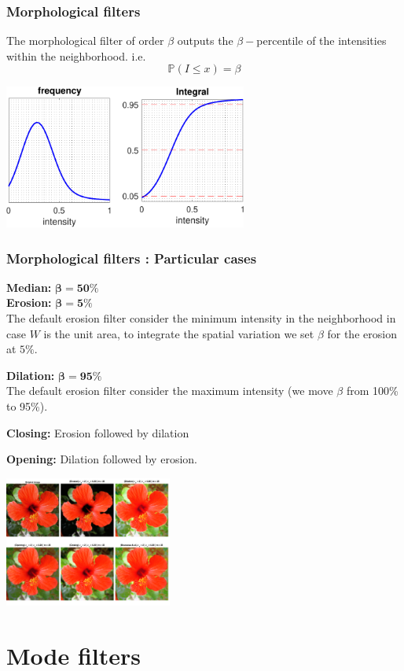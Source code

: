 \documentclass [10 pt, xcolor=pdftex,x11names,table]{beamer}
\begin{document}
\begin{frame}[label=Morpho]
    \frametitle{Morphological filters}
    The morphological filter of order $\beta$ outputs the $\beta-$percentile of the intensities within the neighborhood. i.e.
    \[\mathbb P(I\leq x) = \beta\]
    \begin{center}
    \includegraphics[width=8cm]{int}
    \end{center}
\end{frame}
\begin{frame}[label=Morpho]
    \frametitle{Morphological filters : Particular cases}
    \textbf{Median: }$\mathbf{\beta = 50\%}$\\
    \textbf{Erosion: }$\mathbf{\beta = 5\%}$\\
    {\footnotesize The default erosion filter consider the minimum intensity in the neighborhood in case $W$ is the unit area, to integrate the spatial variation we set $\beta$ for the erosion at $5\%$.}

    \textbf{Dilation: }$\mathbf{\beta = 95\%}$\\
     {\footnotesize The default erosion filter consider the maximum intensity (we move $\beta$ from 100\% to 95\%).}

    \textbf{Closing: } Erosion followed by dilation

    \textbf{Opening: } Dilation followed by erosion.
    \begin{center}
    \includegraphics[width=5.5cm]{bousseau}
    \end{center}
\end{frame}

\section{Mode filters}
\end{document}
